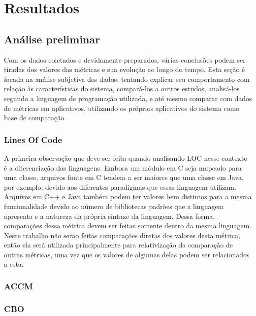 \chapter{Resultados}
\label{cap:resultados}


\section{Análise preliminar}

Com os dados coletados e devidamente preparados, várias conclusões podem ser tiradas dos valores das métricas e sua evolução ao longo do tempo. Esta seção é focada na análise subjetiva dos dados, tentando explicar seu comportamento com relação às características do sistema, compará-los a outros estudos, analisá-los segundo a linguagem de programação utilizada, e até mesmo comparar com dados de métricas em aplicativos, utilizando os próprios aplicativos do sistema como base de comparação.

\subsection{Lines Of Code}
A primeira observação que deve ser feita quando analisando LOC nesse contexto é a diferenciação das linguagens. Embora um módulo em C seja mapeado para uma classe, arquivos fonte em C tendem a ser maiores que uma classe em Java, por exemplo, devido aos diferentes paradigmas que essas linguagem utilizam. Arquivos em C++ e Java também podem ter valores bem distintos para a mesma funcionalidade devido ao número de bibliotecas padrões que a linguagem apresenta e a natureza da própria sintaxe da linguagem. Dessa forma, comparações dessa métrica devem ser feitas somente dentro da mesma linguagem. Neste trabalho não serão feitas comparações diretas dos valores desta métrica, então ela será utilizada principalmente para relativização da comparação de outras métricas, uma vez que os valores de algumas delas podem ser relacionados a esta.



\subsection{ACCM} %
\subsection{CBO}
